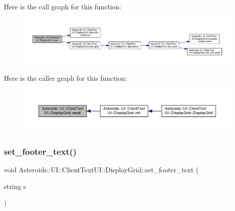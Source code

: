 Here is the call graph for this function\+:\nopagebreak
\begin{figure}[H]
\begin{center}
\leavevmode
\includegraphics[width=350pt]{classAsteroids_1_1UI_1_1ClientTextUI_1_1DisplayGrid_a118e0cad34b68aae5b178bd8e2b344c5_cgraph}
\end{center}
\end{figure}
Here is the caller graph for this function\+:\nopagebreak
\begin{figure}[H]
\begin{center}
\leavevmode
\includegraphics[width=350pt]{classAsteroids_1_1UI_1_1ClientTextUI_1_1DisplayGrid_a118e0cad34b68aae5b178bd8e2b344c5_icgraph}
\end{center}
\end{figure}
\mbox{\label{classAsteroids_1_1UI_1_1ClientTextUI_1_1DisplayGrid_ae1826bd3ba813147465b5129b414feeb}} 
\subsubsection{\texorpdfstring{set\+\_\+footer\+\_\+text()}{set\_footer\_text()}}
{\footnotesize\ttfamily void Asteroids\+::\+U\+I\+::\+Client\+Text\+U\+I\+::\+Display\+Grid\+::set\+\_\+footer\+\_\+text (\begin{DoxyParamCaption}\item[{string}]{s }\end{DoxyParamCaption})}



